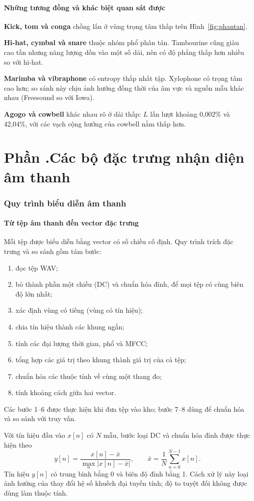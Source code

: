 \documentclass[11pt,a4paper]{article}
\newcommand{\phan}[1]{\clearpage\refstepcounter{part}\part*{Phần \thepart.\texorpdfstring{\enspace}{ }#1}}
\begin{document}
\subsection{Những tương đồng và khác biệt quan sát được}
\textbf{Kick, tom và conga} chồng lấn ở vùng trọng tâm thấp trên Hình~\ref{fig:phantan}.

\textbf{Hi-hat, cymbal và snare} thuộc nhóm phổ phân tán. Tambourine cũng giàu cao tần nhưng năng lượng dồn vào một số dải, nên có độ phẳng thấp hơn nhiều so với hi-hat.

\textbf{Marimba và vibraphone} có entropy thấp nhất tập. Xylophone có trọng tâm cao hơn; so sánh này chịu ảnh hưởng đồng thời của âm vực và nguồn mẫu khác nhau (Freesound so với Iowa).

\textbf{Agogo và cowbell} khác nhau rõ ở dải thấp: $L$ lần lượt khoảng 0,002\% và 42,04\%, với các vạch cộng hưởng của cowbell nằm thấp hơn.
\clearpage

\phan{Các bộ đặc trưng nhận diện âm thanh}
\section{Quy trình biểu diễn âm thanh}\label{sec:quytrinh}
\subsection{Từ tệp âm thanh đến vector đặc trưng}
Mỗi tệp được biểu diễn bằng vector có số chiều cố định. Quy trình trích đặc trưng và so sánh gồm tám bước:
\begin{enumerate}
\item đọc tệp WAV;
\item bỏ thành phần một chiều (DC) và chuẩn hóa đỉnh, để mọi tệp có cùng biên độ lớn nhất;
\item xác định vùng có tiếng (vùng có tín hiệu);
\item chia tín hiệu thành các khung ngắn;
\item tính các đại lượng thời gian, phổ và MFCC;
\item tổng hợp các giá trị theo khung thành giá trị của cả tệp;
\item chuẩn hóa các thuộc tính về cùng một thang đo;
\item tính khoảng cách giữa hai vector.
\end{enumerate}
Các bước 1--6 được thực hiện khi đưa tệp vào kho; bước 7--8 dùng để chuẩn hóa và so sánh với truy vấn.

Với tín hiệu đầu vào $x[n]$ có $N$ mẫu, bước loại DC và chuẩn hóa đỉnh được thực hiện theo
\[
y[n]=\frac{x[n]-\bar{x}}{\max_n|x[n]-\bar{x}|},\qquad
\bar{x}=\frac{1}{N}\sum_{n=0}^{N-1}x[n].
\]
Tín hiệu $y[n]$ có trung bình bằng 0 và biên độ đỉnh bằng 1. Cách xử lý này loại ảnh hưởng của thay đổi hệ số khuếch đại tuyến tính; độ to tuyệt đối không được dùng làm thuộc tính.
\end{document}
